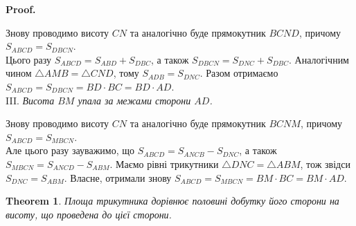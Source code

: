 \documentclass[a4paper, 10pt]{article}
\makeatletter
\theoremstyle{theoremdd}
\newtheorem{theorem}{Theorem}[subsection]
\theoremstyle{theoremdd}
\theoremstyle{theoremdd}
\theoremstyle{theoremdd}
\theoremstyle{theoremdd}
\theoremstyle{theoremdd}
\theoremstyle{theoremdd}
\theoremstyle{theoremdd}
\theoremstyle{theoremdd}
\renewenvironment{proof}[1][Proof.\\]{\par
\pushQED{\hfill \qed}%
\normalfont \topsep6\p@\@plus6\p@\relax
\trivlist
\item\relax
{\bfseries
#1\@addpunct{.}}\hspace\labelsep\ignorespaces
}{%
\popQED\endtrivlist\@endpefalse
}
\makeatother
\begin{document}
\begin{proof}
\begin{figure}[H]
\end{figure}
Знову проводимо висоту $CN$ та аналогічно буде прямокутник $BCND$, причому $S_{ABCD} = S_{DBCN}$. \\
Цього разу $S_{ABCD} = S_{ABD} + S_{DBC}$, а також $S_{DBCN} = S_{DNC} + S_{DBC}$. Аналогічним чином $\triangle AMB = \triangle CND$, тому $S_{ADB} = S_{DNC}$. Разом отримаємо $S_{ABCD} = S_{DBCN} = BD \cdot BC = BD \cdot AD$.
\bigskip \\
III. \textit{Висота $BM$ упала за межами сторони $AD$.}
\begin{figure}[H]
\centering
{}
\end{figure}
Знову проводимо висоту $CN$ та аналогічно буде прямокутник $BCNM$, причому $S_{ABCD} = S_{MBCN}$.\\
Але цього разу зауважимо, що $S_{ABCD} = S_{ANCB} - S_{DNC}$, а також $S_{MBCN} = S_{ANCD} - S_{ABM}$. Маємо рівні трикутники $\triangle DNC = \triangle ABM$, тож звідси $S_{DNC} = S_{ABM}$. Власне, отримали знову $S_{ABCD} = S_{MBCN} = BM \cdot BC = BM \cdot AD$.
\end{proof}

\begin{theorem}
Площа трикутника дорівнює половині добутку його сторони на висоту, що проведена до цієї сторони.
\end{theorem}
\end{document}
